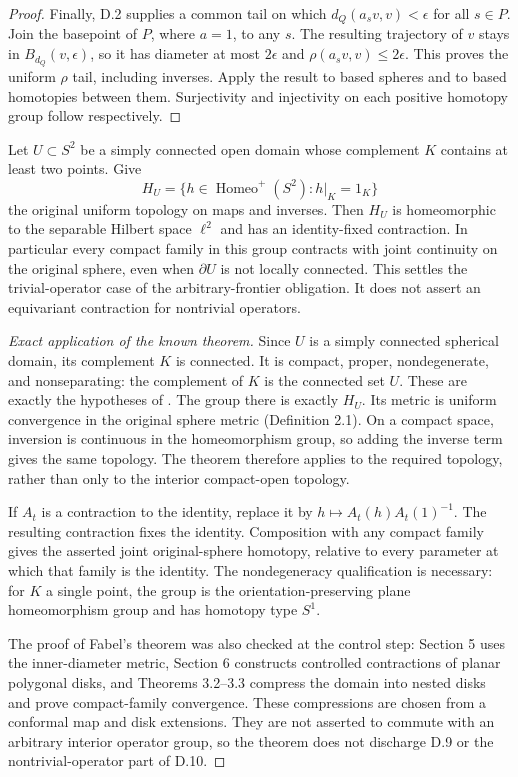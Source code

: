 \begin{proof}
Finally, D.2 supplies a common tail on which
$d_Q(a_sv,v)<\epsilon$ for all $s\in P$.  Join the basepoint of
$P$, where $a=1$, to any $s$.  The resulting trajectory of $v$
stays in $B_{d_Q}(v,\epsilon)$, so it has diameter at most
$2\epsilon$ and $\rho(a_sv,v)\leq2\epsilon$.  This proves the
uniform $\rho$ tail, including inverses.  Apply the result to
based spheres and to based homotopies between them.  Surjectivity
and injectivity on each positive homotopy group follow respectively.
\end{proof}

Let $U\subset S^2$ be a simply connected open domain whose
complement $K$ contains at least two points.  Give
\[
 H_U=\{h\in\operatorname{Homeo}^+(S^2):h|_K=1_K\}
\]
the original uniform topology on maps and inverses.
Then $H_U$ is homeomorphic to the separable Hilbert space
$\ell^2$ and has an identity-fixed contraction.
In particular every compact family in this group contracts
with joint continuity on the original sphere, even when
$\partial U$ is not locally connected.
This settles the trivial-operator case of the arbitrary-frontier
obligation.  It does not assert an equivariant contraction for
nontrivial operators.
\begin{proof}[Exact application of the known theorem]
Since $U$ is a simply connected spherical domain, its complement
$K$ is connected.  It is compact, proper, nondegenerate, and
nonseparating: the complement of $K$ is the connected set $U$.
These are exactly the hypotheses of
\cite[Theorem 1.1, p.~201]{DE_Fabel1998}.
The group there is exactly $H_U$.  Its metric is uniform convergence in the
original sphere metric (Definition 2.1).  On a compact space,
inversion is continuous in the homeomorphism group, so adding the
inverse term gives the same topology.  The theorem therefore
applies to the required topology, rather than only to the interior
compact-open topology.

If $A_t$ is a contraction to the identity, replace it by
$h\mapsto A_t(h)A_t(1)^{-1}$.  The resulting contraction fixes
the identity.  Composition with any compact family gives the
asserted joint original-sphere homotopy, relative to every
parameter at which that family is the identity.
The nondegeneracy qualification is necessary: for $K$ a single
point, the group is the orientation-preserving plane
homeomorphism group and has homotopy type $S^1$.

The proof of Fabel's theorem was also checked at the control step:
Section 5 uses the inner-diameter metric, Section 6 constructs
controlled contractions of planar polygonal disks, and
Theorems 3.2--3.3 compress the domain into nested disks and prove
compact-family convergence.  These compressions are chosen from
a conformal map and disk extensions.  They are not asserted to
commute with an arbitrary interior operator group, so the theorem
does not discharge D.9 or the nontrivial-operator part of D.10.
\end{proof}

